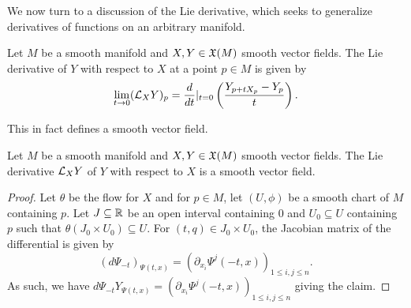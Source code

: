We now turn to a discussion of the Lie derivative, which seeks to generalize derivatives of functions on an arbitrary manifold. 
\begin{definition}\label{def: Lie derivative}
    Let $M$ be a smooth manifold and $X,Y\in\mathfrak{X}(M)$ smooth vector fields. The Lie derivative of $Y$ with respect to $X$ at a point $p\in M$ is given by 
    $$\lim_{t\to0}(\mathcal{L}_{X}Y)_{p}=\frac{d}{dt}|_{t=0}\left(\frac{Y_{p+tX_{p}}-Y_{p}}{t}\right).$$
\end{definition}
This in fact defines a smooth vector field. 
\begin{lemma}\label{lem: Lie derivative is a smooth vector field}
    Let $M$ be a smooth manifold and $X,Y\in\mathfrak{X}(M)$ smooth vector fields. The Lie derivative $\mathcal{L}_{X}Y$ of $Y$ with respect to $X$ is a smooth vector field. 
\end{lemma}
\begin{proof}
    Let $\theta$ be the flow for $X$ and for $p\in M$, let $(U,\phi)$ be a smooth chart of $M$ containing $p$. Let $J\subseteq\mathbb{R}$ be an open interval containing 0 and $U_{0}\subseteq U$ containing $p$ such that $\theta(J_{0}\times U_{0})\subseteq U$. For $(t,q)\in J_{0}\times U_{0}$, the Jacobian matrix of the differential is given by 
    $$(d\Psi_{-t})_{\Psi(t,x)}=(\partial_{x_{i}}\Psi^{j}(-t,x))_{1\leq i,j\leq n}.$$
    As such, we have $d\Psi_{-t}Y_{\Psi(t,x)}=(\partial_{x_{i}}\Psi^{j}(-t,x))_{1\leq i,j\leq n}$ giving the claim. 
\end{proof}